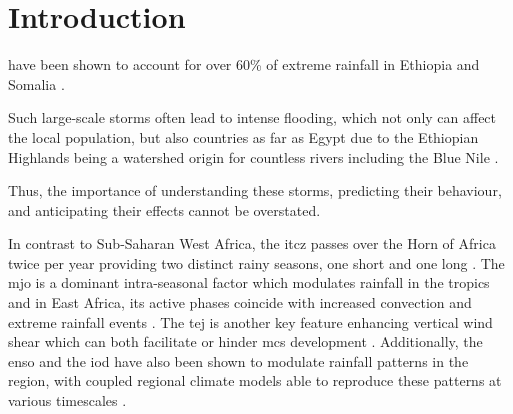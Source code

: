 \chapter{Introduction}
\label{ch:intro}

 have been shown to account for over 60\% of extreme rainfall in Ethiopia and Somalia \citep{Hill2023}.  

Such large-scale storms often lead to intense flooding, which not only can affect the local population, but also countries as far as Egypt due to the Ethiopian Highlands being a watershed origin for countless rivers including the Blue Nile \citep{Legese2020,Zaroug2014}. 

Thus, the importance of understanding these storms, predicting their behaviour, and anticipating their effects cannot be overstated. 


In contrast to Sub-Saharan West Africa, the \acrfull{itcz} passes over the Horn of Africa twice per year providing two distinct rainy seasons, one short and one long \citep{Palmer2023,Tefera2025}. The \acrfull{mjo} is a dominant intra-seasonal factor which modulates rainfall in the tropics and in East Africa, its active phases coincide with increased convection and extreme rainfall events \citep{Camberlin2019,Ochieng2023,Pohl2006}.  The \acrfull{tej} is another key feature enhancing vertical wind shear which can both facilitate or hinder \acrshort{mcs} development \citep{Farnsworth2011,Vashisht2021}. Additionally, the \acrfull{enso} and the \acrfull{iod} have also been shown to modulate rainfall patterns in the region, with coupled regional climate models able to reproduce these patterns at various timescales \citep{Dubache2019,Endris2019,Vashisht2021,Zaroug2014}. 

